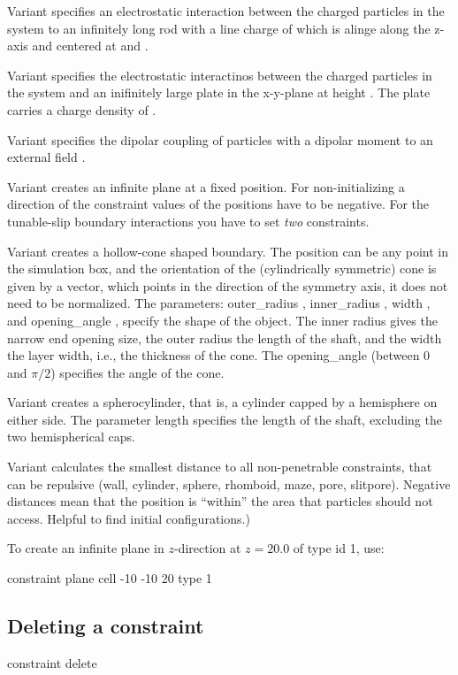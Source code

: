 Variant  specifies an electrostatic interaction between the
charged particles in the system to an infinitely long rod with a line
charge of  which is alinge along the z-axis and centered
at  and .

Variant  specifies the electrostatic interactinos between
the charged particles in the system and an inifinitely large plate in
the x-y-plane at height . The plate carries a charge density of
.
  
Variant  specifies the dipolar coupling of particles with a
dipolar moment to an external field   .

Variant  creates an infinite plane at a fixed position. For
non-initializing a direction of the constraint values of the positions
have to be negative. For the tunable-slip boundary interactions you
have to set \emph{two} constraints.

Variant  creates a hollow-cone shaped boundary. The position can be any point in the simulation
box, and the orientation of the (cylindrically symmetric) cone is
given by a vector, which points in the direction of the symmetry axis, it
does not need to be normalized. The parameters: outer_radius ,
inner_radius , width , and opening_angle , specify the shape of the object. The inner radius gives the narrow end opening size, the outer radius the length of the shaft, and the width the layer width, i.e., the thickness of the cone. The opening_angle (between 0 and $\pi/2$) specifies the angle of the cone. 

Variant  creates a spherocylinder, that is, a cylinder capped by a hemisphere on either side. The parameter length  specifies the length of the shaft, excluding the two hemispherical caps. 

Variant  calculates the smallest distance to all non-penetrable
constraints, that can be repulsive (wall, cylinder, sphere, rhomboid, maze, pore, slitpore).
Negative distances mean that the position is ``within'' the area that
particles should not access. Helpful to find initial configurations.) 

To create an infinite plane in $z$-direction at $z=20.0$ of type id 1,
use:
\begin{code}
  constraint plane cell -10 -10 20 type 1
\end{code}

\subsection{Deleting a constraint}
\begin{essyntax}
  constraint delete  
\end{essyntax}

